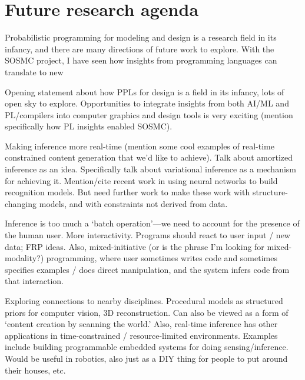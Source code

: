 \documentclass[
10pt, %
a4paper, %
oneside, %
headinclude,footinclude, %
BCOR5mm, %
]{scrartcl}
\begin{document}



\section*{Future research agenda}

Probabilistic programming for modeling and design is a research field in its infancy, and there are many directions of future work to explore. With the SOSMC project, I have seen how insights from programming languages can translate to new

Opening statement about how PPLs for design is a field in its infancy, lots of open sky to explore. Opportunities to integrate insights from both AI/ML and PL/compilers into computer graphics and design tools is very exciting (mention specifically how PL insights enabled SOSMC).

Making inference more real-time (mention some cool examples of real-time constrained content generation that we'd like to achieve). Talk about amortized inference as an idea. Specifically talk about variational inference as a mechanism for achieving it. Mention/cite recent work in using neural networks to build recognition models. But need further work to make these work with structure-changing models, and with constraints not derived from data.

Inference is too much a `batch operation'---we need to account for the presence of the human user. More interactivity. Programs should react to user input / new data; FRP ideas. Also, mixed-initiative (or is the phrase I'm looking for mixed-modality?) programming, where user sometimes writes code and sometimes specifies examples / does direct manipulation, and the system infers code from that interaction.

Exploring connections to nearby disciplines. Procedural models as structured priors for computer vision, 3D reconstruction. Can also be viewed as a form of `content creation by scanning the world.' Also, real-time inference has other applications in time-constrained / resource-limited environments. Examples include building programmable embedded systems for doing sensing/inference. Would be useful in robotics, also just as a DIY thing for people to put around their houses, etc.




\end{document}
